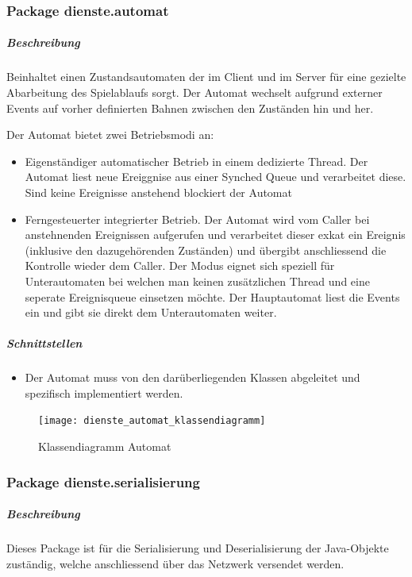 \documentclass[12pt,halfparskip]{scrartcl}
\begin{document}
\clearpage
\subsubsection{Package dienste.automat} %
\label{ssub:package_dienste}
\subparagraph{Beschreibung}
Beinhaltet einen Zustandsautomaten der im Client und im Server für eine gezielte Abarbeitung des Spielablaufs sorgt. Der Automat wechselt aufgrund externer Events auf vorher definierten Bahnen zwischen den Zuständen hin und her. 

Der Automat bietet zwei Betriebsmodi an:
\begin{itemize}
	\item Eigenständiger automatischer Betrieb in einem dedizierte Thread. Der Automat liest neue Ereiggnise aus einer Synched Queue und verarbeitet diese. Sind keine Ereignisse anstehend blockiert der Automat
	\item Ferngesteuerter integrierter Betrieb. Der Automat wird vom Caller bei anstehnenden Ereignissen  aufgerufen und verarbeitet dieser exkat ein Ereignis (inklusive den dazugehörenden Zuständen) und übergibt anschliessend die Kontrolle wieder dem Caller. Der Modus eignet sich speziell für Unterautomaten bei welchen man keinen zusätzlichen Thread und eine seperate Ereignisqueue einsetzen möchte. Der Hauptautomat liest die Events ein und gibt sie direkt dem Unterautomaten weiter. 
\end{itemize}

\subparagraph{Schnittstellen} %
\label{ssub:schnittstellen}
\begin{itemize}
	\item Der Automat muss von den darüberliegenden Klassen abgeleitet und spezifisch implementiert werden.
\end{itemize}	

\begin{figure}[h]
	\centering
	\texttt{[image: dienste\_automat\_klassendiagramm]}
	\caption{Klassendiagramm Automat}
	\label{fig:dienste_serialisierung}
\end{figure}


\clearpage
\subsubsection{Package dienste.serialisierung}

\subparagraph{Beschreibung}
Dieses Package ist für die Serialisierung und Deserialisierung der Java-Objekte zuständig, welche anschliessend über das Netzwerk versendet werden. 
\end{document}
